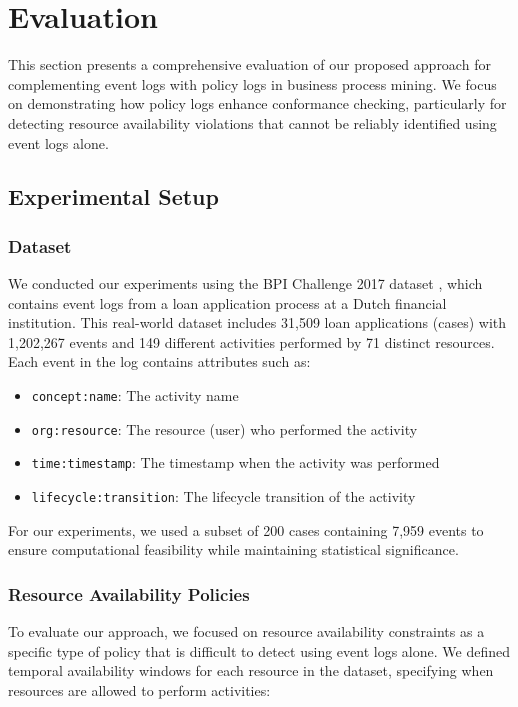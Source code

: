 \section{Evaluation}\label{sec:evaluation}

This section presents a comprehensive evaluation of our proposed approach for complementing event logs with policy logs in business process mining. We focus on demonstrating how policy logs enhance conformance checking, particularly for detecting resource availability violations that cannot be reliably identified using event logs alone.

\subsection{Experimental Setup}

\subsubsection{Dataset}
We conducted our experiments using the BPI Challenge 2017 dataset \cite{vanDongen2017}, which contains event logs from a loan application process at a Dutch financial institution. This real-world dataset includes 31,509 loan applications (cases) with 1,202,267 events and 149 different activities performed by 71 distinct resources. Each event in the log contains attributes such as:

\begin{itemize}
    \item \texttt{concept:name}: The activity name
    \item \texttt{org:resource}: The resource (user) who performed the activity
    \item \texttt{time:timestamp}: The timestamp when the activity was performed
    \item \texttt{lifecycle:transition}: The lifecycle transition of the activity
\end{itemize}

For our experiments, we used a subset of 200 cases containing 7,959 events to ensure computational feasibility while maintaining statistical significance.

\subsubsection{Resource Availability Policies}
To evaluate our approach, we focused on resource availability constraints as a specific type of policy that is difficult to detect using event logs alone. We defined temporal availability windows for each resource in the dataset, specifying when resources are allowed to perform activities:

